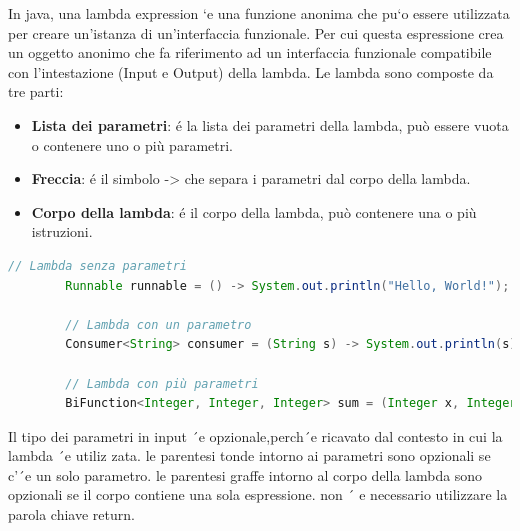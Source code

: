 \documentclass[11pt]{article}
\begin{document}
     In java, una lambda expression `e una funzione anonima che pu`o essere
     utilizzata per creare un’istanza di un’interfaccia funzionale. Per cui questa espressione crea un
     oggetto anonimo che fa riferimento ad un interfaccia funzionale compatibile con l’intestazione
     (Input e Output) della lambda.
    Le lambda sono composte da tre parti:
    \begin{itemize}
        \item \textbf{Lista dei parametri}: é la lista dei parametri della lambda, può essere vuota o contenere uno o più parametri.
        \item \textbf{Freccia}: é il simbolo -> che separa i parametri dal corpo della lambda.
        \item \textbf{Corpo della lambda}: é il corpo della lambda, può contenere una o più istruzioni.
        \end{itemize}
    \begin{lstlisting}[language=Java]
        // Lambda senza parametri
        Runnable runnable = () -> System.out.println("Hello, World!");

        // Lambda con un parametro
        Consumer<String> consumer = (String s) -> System.out.println(s);

        // Lambda con più parametri
        BiFunction<Integer, Integer, Integer> sum = (Integer x, Integer y) -> x + y;
    \end{lstlisting}


    Il tipo dei parametri in input ´e opzionale,perch´e ricavato dal contesto in cui la lambda ´e utiliz
    zata. le parentesi tonde intorno ai parametri sono opzionali se c’´e un solo parametro. le parentesi
     graffe intorno al corpo della lambda sono opzionali se il corpo contiene una sola espressione.
     non ´ e necessario utilizzare la parola chiave return.
\end{document}
